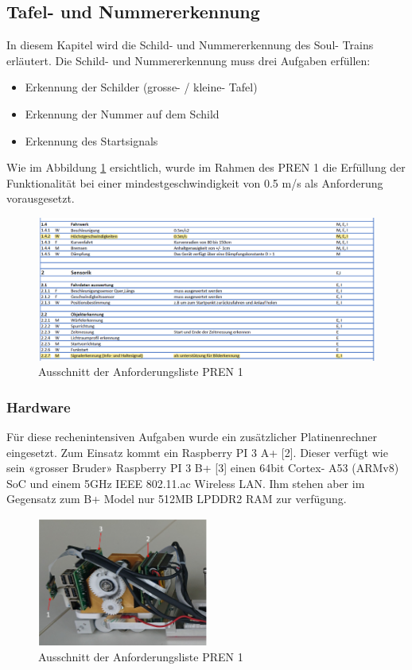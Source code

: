 \documentclass[../../main.tex]{subfiles}
\begin{document}
\subsection{Tafel- und Nummererkennung} \label{numberdetection}
In diesem Kapitel wird die Schild- und Nummererkennung des Soul- Trains erläutert. Die Schild- und Nummererkennung muss drei Aufgaben erfüllen:
\begin{itemize}
  \item Erkennung der Schilder (grosse- / kleine- Tafel)
  \item Erkennung der Nummer auf dem Schild
  \item Erkennung des Startsignals
\end{itemize}

Wie im Abbildung \ref{fig:ausschnitt_Anforderungsliste} ersichtlich, wurde im Rahmen des PREN 1 die Erfüllung der Funktionalität bei einer mindestgeschwindigkeit von 0.5 m/s als Anforderung vorausgesetzt.

\begin{figure}[H] %
  \centering
  \includegraphics[width=1\textwidth]{Anforderung.png}
  \caption{Ausschnitt der Anforderungsliste PREN 1}
  \label{fig:ausschnitt_Anforderungsliste}
\end{figure}


\subsubsection{Hardware}
Für diese rechenintensiven Aufgaben wurde ein zusätzlicher Platinenrechner eingesetzt. Zum Einsatz kommt ein Raspberry PI 3 A+ [2]. Dieser verfügt wie sein «grosser Bruder» Raspberry PI 3 B+ [3] einen 64bit Cortex- A53 (ARMv8) SoC und einem 5GHz IEEE 802.11.ac Wireless LAN. Ihm stehen aber im Gegensatz zum B+ Model nur 512MB LPDDR2 RAM zur verfügung.

\begin{figure}[H] %
  \centering
  \includegraphics[width=0.5\textwidth]{RPI-uebersicht.png}
  \caption{Ausschnitt der Anforderungsliste PREN 1}
  \label{fig:rpi-uebersicht}
\end{figure}
\end{document}
